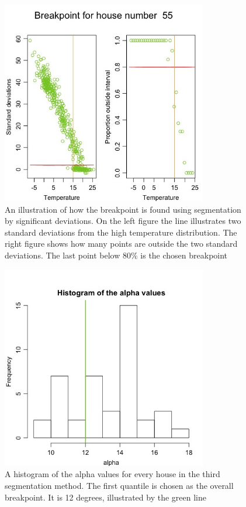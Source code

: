 \begin{figure}
    \centering
    \includegraphics[width=0.8\textwidth]{../../../figures/Breakpoint.jpeg}
    \caption{An illustration of how the breakpoint is found using segmentation by significant deviations. On the left figure the line illustrates two standard deviations from the high temperature distribution.
    The right figure shows how many points are outside the two standard deviations. The last point below 80\% is the chosen breakpoint}
    \label{fig: Breakpoint}
\end{figure}

\begin{figure}
    \centering
    \includegraphics[width=0.8\textwidth]{../../../figures/AlphaHist.jpeg}
    \caption{A histogram of the alpha values for every house in the third segmentation method. The first quantile is chosen as the overall breakpoint. It is 12 degrees, illustrated by the green line}
    \label{fig: AlphaHist}
\end{figure}
